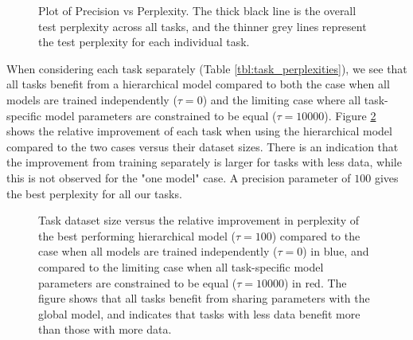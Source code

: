 \documentclass[fullpaper]{nldl}
\begin{document}
\begin{figure}[ht]
    \caption{Plot of Precision vs Perplexity. The thick black line is the overall test perplexity across all tasks, and the thinner grey lines represent the test perplexity for each individual task.}
    \label{fig:results_plot}
\end{figure}

When considering each task separately (Table \ref{tbl:task_perplexities}), we see that all tasks benefit from a hierarchical model compared to both the case when all models are trained independently ($\tau = 0$) and the limiting case where all task-specific model parameters are constrained to be equal ($\tau=10000$). Figure \ref{fig:relative_improvement} shows the relative improvement of each task when using the hierarchical model compared to the two cases versus their dataset sizes. There is an indication that the improvement from training separately is larger for tasks with less data, while this is not observed for the "one model" case. A precision parameter of $100$ gives the best perplexity for all our tasks.
\begin{figure}[ht]
    \centering
    \caption{Task dataset size versus the relative improvement in perplexity of the best performing hierarchical model ($\tau = 100$) compared to the case when all models are trained independently ($\tau = 0$) in blue, and compared to the limiting case when all task-specific model parameters are constrained to be equal ($\tau=10000$) in red. The figure shows that all tasks benefit from sharing parameters with the global model, and indicates that tasks with less data benefit more than those with more data.}
    \label{fig:relative_improvement}
\end{figure}
\end{document}
